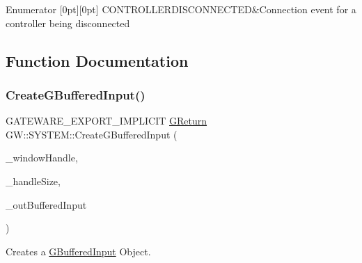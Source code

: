 \begin{DoxyEnumFields}{Enumerator}
[0pt][0pt]{}\mbox{\label{namespace_g_w_1_1_s_y_s_t_e_m_a90b22b31302f4172043122adfa8e49d7a6e7765910e63d5babc83ee42acb46eb3}} 
C\+O\+N\+T\+R\+O\+L\+L\+E\+R\+D\+I\+S\+C\+O\+N\+N\+E\+C\+T\+ED&Connection event for a controller being disconnected \\
\hline

\end{DoxyEnumFields}


\subsection{Function Documentation}
\mbox{\label{namespace_g_w_1_1_s_y_s_t_e_m_ad32802f3cb2ba314449915b556af4a33}} 
\subsubsection{\texorpdfstring{Create\+G\+Buffered\+Input()}{CreateGBufferedInput()}}
{\footnotesize\ttfamily G\+A\+T\+E\+W\+A\+R\+E\+\_\+\+E\+X\+P\+O\+R\+T\+\_\+\+I\+M\+P\+L\+I\+C\+IT \mbox{\hyperlink{namespace_g_w_a67a839e3df7ea8a5c5686613a7a3de21}{G\+Return}} G\+W\+::\+S\+Y\+S\+T\+E\+M\+::\+Create\+G\+Buffered\+Input (\begin{DoxyParamCaption}\item[{void $\ast$}]{\+\_\+window\+Handle,  }\item[{unsigned int}]{\+\_\+handle\+Size,  }\item[{\mbox{\hyperlink{class_g_w_1_1_s_y_s_t_e_m_1_1_g_buffered_input}{G\+Buffered\+Input}} $\ast$$\ast$}]{\+\_\+out\+Buffered\+Input }\end{DoxyParamCaption})}



Creates a \mbox{\hyperlink{class_g_w_1_1_s_y_s_t_e_m_1_1_g_buffered_input}{G\+Buffered\+Input}} Object. 

